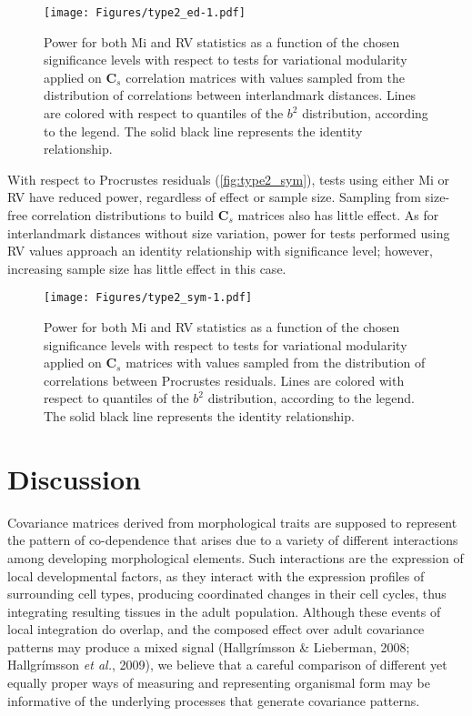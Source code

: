 \documentclass[12pt,]{article}
\begin{document}
\begin{figure}[htbp]
\centering
\texttt{[image: Figures/type2\_ed-1.pdf]}
\caption{Power for both Mi and RV statistics as a function of the chosen
significance levels with respect to tests for variational modularity
applied on $\mathbf{C}_s$ correlation matrices with values sampled from
the distribution of correlations between interlandmark distances. Lines
are colored with respect to quantiles of the $b^2$ distribution,
according to the legend. The solid black line represents the identity
relationship. \label{fig:type2_ed}}
\end{figure}

With respect to Procrustes residuals (\autoref{fig:type2_sym}), tests
using either Mi or RV have reduced power, regardless of effect or sample
size. Sampling from size-free correlation distributions to build
$\mathbf{C}_s$ matrices also has little effect. As for interlandmark
distances without size variation, power for tests performed using RV
values approach an identity relationship with significance level;
however, increasing sample size has little effect in this case.

\begin{figure}[htbp]
\centering
\texttt{[image: Figures/type2\_sym-1.pdf]}
\caption{Power for both Mi and RV statistics as a function of the chosen
significance levels with respect to tests for variational modularity
applied on $\mathbf{C}_s$ matrices with values sampled from the
distribution of correlations between Procrustes residuals. Lines are
colored with respect to quantiles of the $b^2$ distribution, according
to the legend. The solid black line represents the identity
relationship. \label{fig:type2_sym}}
\end{figure}

\section{Discussion}\label{discussion}

Covariance matrices derived from morphological traits are supposed to
represent the pattern of co-dependence that arises due to a variety of
different interactions among developing morphological elements. Such
interactions are the expression of local developmental factors, as they
interact with the expression profiles of surrounding cell types,
producing coordinated changes in their cell cycles, thus integrating
resulting tissues in the adult population. Although these events of
local integration do overlap, and the composed effect over adult
covariance patterns may produce a mixed signal (Hallgrímsson \&
Lieberman, 2008; Hallgrímsson \emph{et al.}, 2009), we believe that a
careful comparison of different yet equally proper ways of measuring and
representing organismal form may be informative of the underlying
processes that generate covariance patterns.
\end{document}
